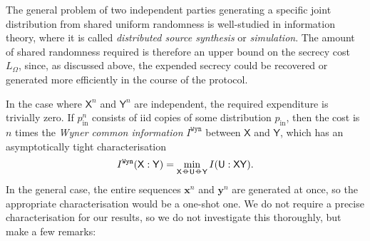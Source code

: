 \documentclass[10pt, a4paper]{article}
\numberwithin{equation}{section} %
\theoremstyle{definition}
\theoremstyle{plain}
\newcommand{\?}{\mathrel{?}} %
\newcommand{\cvec}[1]{\boldsymbol{\mathbf{#1}}}    %
\newcommand*\markov{\mathrel{\ooalign{\hidewidth$\circ$\hidewidth\cr$-$\cr}}} %
\newcommand{\crv}[1]{\mathsf{#1}}
\newcommand{\prin}[1][p]{#1_{\mathrm{in}}}
\begin{document}
    The general problem of two independent parties generating a specific joint distribution from shared uniform randomness is well-studied in information theory, where it is called \emph{distributed source synthesis} or \emph{simulation}. The amount of shared randomness required is therefore an upper bound on the secrecy cost \(L_{\Omega}\), since, as discussed above, the expended secrecy could be recovered or generated more efficiently in the course of the protocol.

    In the case where \(\crv{X}^n\) and \(\crv{Y}^n\) are independent, the required expenditure is trivially zero. If \(\prin^n\) consists of iid copies of some distribution \(\prin\), then the cost is \(n\) times the \emph{Wyner common information} \(I^{\mathtt{Wyn}}\) between \(\crv{X}\) and \(\crv{Y}\), which has an asymptotically tight characterisation~\cite[Thm V.3]{CorrReview}
    \begin{equation}
      I^{\mathtt{Wyn}}(\crv{X}:\crv{Y}) = \min_{\crv{X} \markov \crv{U} \markov \crv{Y}} I(\crv{U}:\crv{XY}).
    \end{equation}
    In the general case, the entire sequences \(\cvec{x}^n\) and \(\cvec{y}^n\) are generated at once, so the appropriate characterisation would be a one-shot one. We do not require a precise characterisation for our results, so we do not investigate this thoroughly, but make a few remarks:
\end{document}

